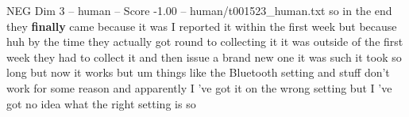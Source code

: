 \begin{textsample}{NEG Dim 3 – human – Score -1.00 – human/t001523\_human.txt}  \label{ex:f3_neg_035}
so in the end they \textbf{finally} came because it was I reported it within the first week but because huh by the time they actually got round to collecting it it was outside of the first week they had to collect it and then issue a brand new one it was such it took so long but now it works but um things like the Bluetooth setting and stuff don't work for some reason and apparently I 've got it on the wrong setting but I 've got no idea what the right setting is so

\end{textsample}
